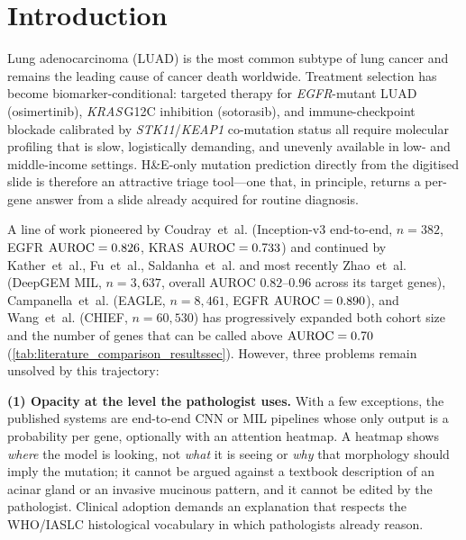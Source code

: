 \section*{Introduction}

Lung adenocarcinoma (LUAD) is the most common subtype of lung cancer
and remains the leading cause of cancer death worldwide.\cite{herbst2018lung}
Treatment selection has become biomarker-conditional: targeted
therapy for \textit{EGFR}-mutant LUAD (osimertinib),\cite{soria2018flaura}
\textit{KRAS}\,G12C inhibition (sotorasib),\cite{skoulidis2021codebreak}
and immune-checkpoint blockade calibrated by
\textit{STK11}/\textit{KEAP1} co-mutation
status\cite{skoulidis2018stk11pd1} all require molecular profiling
that is slow, logistically demanding, and unevenly available in
low- and middle-income settings.\cite{vanderlaan2018molecular}
H\&E-only mutation prediction directly from the digitised slide is
therefore an attractive triage tool---one that, in principle,
returns a per-gene answer from a slide already acquired for routine
diagnosis.

A line of work pioneered by Coudray~et~al.\cite{coudray2018classification}
(Inception-v3 end-to-end, $n=382$, EGFR $\text{AUROC}=0.826$,
KRAS $\text{AUROC}=0.733$) and continued by
Kather~et~al.\cite{kather2020pancancer}, Fu~et~al.\cite{fu2020pancancer},
Saldanha~et~al.\cite{saldanha2023npj} and most recently
Zhao~et~al.\cite{zhao2025deepgem} (DeepGEM MIL, $n=3{,}637$, overall
AUROC $0.82$--$0.96$ across its target genes), Campanella~et~al.\cite{campanella2025eagle}
(EAGLE, $n=8{,}461$, EGFR $\text{AUROC}=0.890$), and
Wang~et~al.\cite{wang2024chief} (CHIEF, $n=60{,}530$) has progressively
expanded both cohort size and the number of genes that can be called
above $\text{AUROC}=0.70$ (\cref{tab:literature_comparison_resultssec}).
However, three problems remain unsolved by this trajectory:

\textbf{(1) Opacity at the level the pathologist uses.}
With a few exceptions, the published systems are
end-to-end CNN or MIL pipelines whose only output is a probability
per gene, optionally with an attention heatmap.
A heatmap shows \emph{where} the model is looking, not \emph{what}
it is seeing or \emph{why} that morphology should imply the
mutation; it cannot be argued against a textbook description of an
acinar gland or an invasive mucinous pattern, and it cannot be
edited by the pathologist.\cite{jain2019attention,rudin2019stop}
Clinical adoption demands an explanation that respects the WHO/IASLC
histological vocabulary in which pathologists already
reason.\cite{who2021thoracic,nicholson2022ialcslurp}

